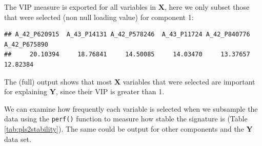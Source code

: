 \documentclass[]{book}
\newenvironment{Shaded}{\begin{snugshade}}{\end{snugshade}}
\newcommand{\CommentTok}[1]{\textcolor[rgb]{0.56,0.35,0.01}{\textit{#1}}}
\newcommand{\DataTypeTok}[1]{\textcolor[rgb]{0.13,0.29,0.53}{#1}}
\newcommand{\DecValTok}[1]{\textcolor[rgb]{0.00,0.00,0.81}{#1}}
\newcommand{\KeywordTok}[1]{\textcolor[rgb]{0.13,0.29,0.53}{\textbf{#1}}}
\newcommand{\NormalTok}[1]{#1}
\newcommand{\OperatorTok}[1]{\textcolor[rgb]{0.81,0.36,0.00}{\textbf{#1}}}
\newcommand{\StringTok}[1]{\textcolor[rgb]{0.31,0.60,0.02}{#1}}
\begin{document}
The VIP measure is exported for all variables in \(\boldsymbol X\), here we only subset those that were selected (non null loading value) for component 1:

\begin{Shaded}
\end{Shaded}

\begin{verbatim}
## A_42_P620915  A_43_P14131 A_42_P578246  A_43_P11724 A_42_P840776 A_42_P675890 
##     20.10394     18.76841     14.50085     14.03470     13.37657     12.82384
\end{verbatim}

The (full) output shows that most \(\boldsymbol X\) variables that were selected are important for explaining \(\boldsymbol Y\), since their VIP is greater than 1.

We can examine how frequently each variable is selected when we subsample the data using the \texttt{perf()} function to measure how stable the signature is (Table \ref{tab:pls2stability}). The same could be output for other components and the \(\boldsymbol Y\) data set.

\begin{Shaded}
\end{Shaded}
\end{document}
